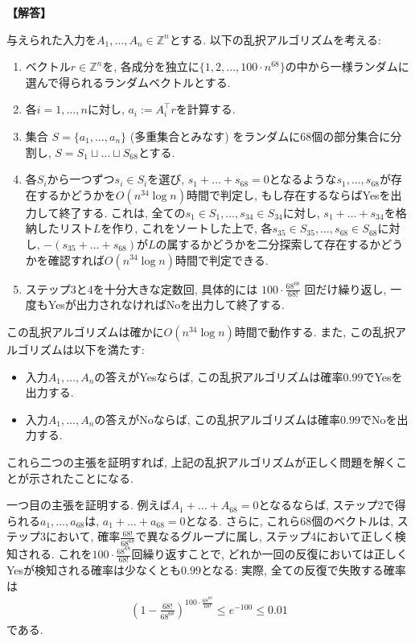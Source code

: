 \documentclass[12pt,a4paper]{article}
\newenvironment{solution}{
    \vspace{0.5em}
    \begin{tcolorbox}[colback=white, colframe=black, boxrule=1pt, arc=0mm, breakable]
    \noindent
    \textbf{【解答】}
    \vspace{0.3em}
}{
    \end{tcolorbox}
    \vspace{1em}
}
\begin{document}
\begin{solution}
  与えられた入力を$A_1,\dots,A_n\in\mathbb{Z}^n$とする. 以下の乱択アルゴリズムを考える:
  \begin{enumerate}
    \item ベクトル$r\in\mathbb{Z}^n$を, 各成分を独立に$\{1, 2,\dots,100\cdot n^{68}\}$の中から一様ランダムに選んで得られるランダムベクトルとする.
    \item 各$i=1,\dots,n$に対し, $a_i := A_i^\top r$を計算する.
    \item 集合 $S=\{a_1,\dots,a_n\}$ (多重集合とみなす) をランダムに68個の部分集合に分割し, $S=S_1\sqcup \dots \sqcup S_{68}$とする.
    \item 各$S_i$から一つずつ$s_i\in S_i$を選び, $s_1+\dots+s_{68}=0$となるような$s_1,\dots,s_{68}$が存在するかどうかを$O(n^{34}\log n)$時間で判定し, もし存在するならばYesを出力して終了する. これは, 全ての$s_1\in S_1,\dots,s_{34}\in S_{34}$に対し, $s_1+\dots+s_{34}$を格納したリスト$L$を作り, これをソートした上で, 各$s_{35}\in S_{35},\dots,s_{68}\in S_{68}$に対し, $-(s_{35}+\dots+s_{68})$が$L$の属するかどうかを二分探索して存在するかどうかを確認すれば$O(n^{34}\log n)$時間で判定できる.
    \item ステップ3と4を十分大きな定数回, 具体的には $100\cdot \frac{68^{68}}{68!}$ 回だけ繰り返し, 一度もYesが出力されなければNoを出力して終了する.
  \end{enumerate}

  この乱択アルゴリズムは確かに$O(n^{34}\log n)$時間で動作する. また, この乱択アルゴリズムは以下を満たす:
  \begin{itemize}
    \item 入力$A_1,\dots,A_n$の答えがYesならば, この乱択アルゴリズムは確率$0.99$でYesを出力する.
    \item 入力$A_1,\dots,A_n$の答えがNoならば, この乱択アルゴリズムは確率$0.99$でNoを出力する.
  \end{itemize}
  これら二つの主張を証明すれば, 上記の乱択アルゴリズムが正しく問題を解くことが示されたことになる.
  
  一つ目の主張を証明する. 例えば$A_1+\dots+A_{68}=0$となるならば, ステップ2で得られる$a_1,\dots,a_{68}$は, $a_1+\dots+a_{68}=0$となる. さらに, これら68個のベクトルは, ステップ3において, 確率$\frac{68!}{68^{68}}$で異なるグループに属し, ステップ4において正しく検知される. これを$100\cdot \frac{68^{68}}{68!}$回繰り返すことで, どれか一回の反復においては正しくYesが検知される確率は少なくとも$0.99$となる: 実際, 全ての反復で失敗する確率は
  \begin{align*}
    \left(1-\frac{68!}{68^{68}}\right)^{100\cdot \frac{68^{68}}{68!}} \le e^{-100} \le 0.01
  \end{align*}
  である.


\end{solution}
\end{document}
